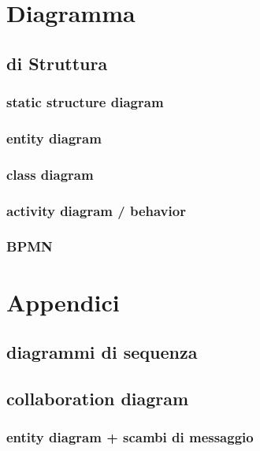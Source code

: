 \documentclass[12pt,a4paper,oneside]{article} %
\begin{document}
\section{Diagramma}

\subsection{di Struttura}

\subsubsection{static structure diagram}
\subsubsection{entity diagram}
\subsubsection{class diagram}
\subsubsection{activity diagram / behavior}
\subsubsection{BPMN}

\newpage %

	
\section{Appendici}

\subsection{diagrammi di sequenza}
\subsection{collaboration diagram}
\subsubsection{entity diagram + scambi di messaggio}

\newpage %




\end{document}
